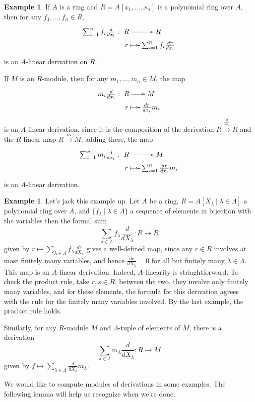 \documentclass{amsart}[12pt]
\numberwithin{equation}{section}
\theoremstyle{plain} %
\theoremstyle{definition}
\newtheorem{ex}[equation]{Example}
\theoremstyle{remark}
\newcommand{\xra}[1]{\xrightarrow{#1}}
\begin{document}
\begin{ex}
If $A$ is a ring and $R=A[x_1,\dots,x_n]$ is a polynomial ring over $A$, then for any $f_1,\dots,f_n\in R$,
\[\xymatrix@R=0pc@C=0pc{ \sum_{i=1}^n f_i \frac{d}{dx_i}:& R \ar[rrr] &&& R \\
& r \ar@{|->}[rrr] &&& \sum_{i=1}^n f_i \frac{dr}{dx_i}}\]
is an $A$-linear derivation on $R$.

If $M$ is an $R$-module, then for any $m_1,\dots,m_n \in M$, the map
\[ \xymatrix@R=0pc@C=0pc{m_i \frac{d}{dx_i}:& R\ar[rrr] &&& M\\
& r \ar@{|->}[rrr] &&& \frac{dr}{dx_i} m_i}\]
is an $A$-linear derivation, since it is the composition of the derivation $R\xra{\frac{d}{dx_i}} R$ and the $R$-linear map $R\xra{m} M$; adding these, the map
\[\xymatrix@R=0pc@C=0pc{ \sum_{i=1}^n m_i \frac{d}{dx_i}:& R \ar[rrr] &&& M \\
& r \ar@{|->}[rrr]&&& \sum_{i=1}^n \frac{dr}{dx_i} m_i}\]
is an $A$-linear derivation.
\end{ex}

\begin{ex}
Let's jack this example up.
Let $A$ be a ring, $R=A[X_\lambda \ | \ \lambda\in\Lambda]$ a polynomial ring over $A$, and $\{f_\lambda \ | \ \lambda\in \Lambda\}$ a sequence of elements in bijection with the variables
then the formal sum
\[ \sum_{\lambda\in \Lambda} f_\lambda \frac{d}{dX_\lambda} : R\to R\]
given by $r \mapsto \sum_{\lambda\in\Lambda} f_\lambda \frac{dr}{dX_\lambda}$
gives a well-defined map, since any $r\in R$ involves at most finitely many variables, and hence $ \frac{dr}{dX_\lambda}=0$ for all but finitely many $\lambda\in \Lambda$. This map is an $A$-linear derivation. Indeed, $A$-linearity is striaghtforward. To check the product rule, take $r,s\in R$; between the two, they involve only finitely many variables, and for these elements, the formula for this derivation agrees with the rule for the finitely many variables involved. By the last example, the product rule holds. 

Similarly, for any $R$-module $M$ and $\Lambda$-tuple of elements of $M$, there is a derivation
\[ \sum_{\lambda\in \Lambda} m_\lambda \frac{d}{dX_\lambda} : R\to M\]
given by $f \mapsto \sum_{\lambda\in \Lambda}  \frac{d}{dX_\lambda} m_\lambda$.
\end{ex}

We would like to compute modules of derivations in some examples. The following lemma will help us recognize when we're done.
\end{document}
